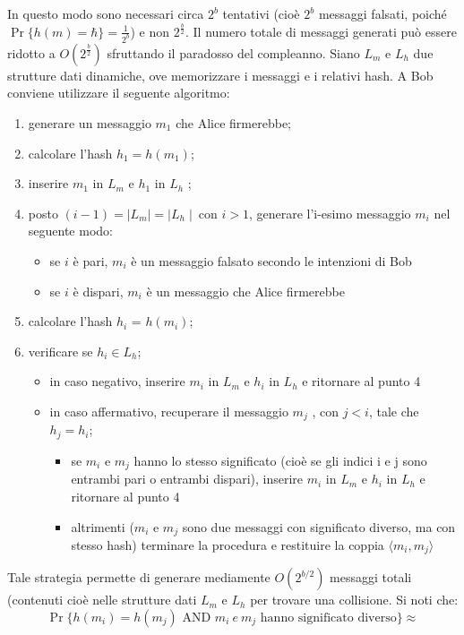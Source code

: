 In questo modo sono necessari circa $2^b$ tentativi (cioè $2^b$ messaggi falsati, poiché $\Pr \{h(m) = \hbar \} = \frac{1}{2^b}$) e non $2^{\frac{b}{2}}$. Il numero totale di messaggi generati può essere ridotto a $O(2^{\frac{b}{2}})$ sfruttando il paradosso del compleanno. Siano $L_m$ e $L_h$ due strutture dati dinamiche, ove memorizzare i messaggi e i relativi hash. A Bob conviene utilizzare il seguente algoritmo:
\begin{enumerate}
\item generare un messaggio $m_1$ che Alice firmerebbe;
\item calcolare l'hash $h_1 = h(m_1)$;
\item inserire $m_1$ in $L_m$ e $h_1$ in $L_h$ ;
\item posto $(i - 1) = \mid L_m \mid = \mid L_h \mid \: \text{con } i>1$, generare l'i-esimo messaggio $m_i$ nel seguente modo:
	\begin{itemize}
		\item se $i$ è pari, $m_i$ è un messaggio falsato secondo le intenzioni di Bob
		\item se $i$ è dispari, $m_i$ è un messaggio che Alice firmerebbe
	\end{itemize}
\item calcolare l'hash $h_i$ = $h(m_i)$;
\item verificare se $h_i \in L_h$;
	\begin{itemize}
		\item in caso negativo, inserire $m_i$ in $L_m$ e $h_i$ in $L_h$ e ritornare al punto 4
		\item in caso affermativo, recuperare il messaggio $m_j$ , con $j < i$, tale che $h_j = h_i$;
		\begin{itemize}
			\item se $m_i$ e $m_j$ hanno lo stesso significato (cioè se gli indici i e j sono entrambi pari o entrambi dispari), inserire $m_i$ in $L_m$ e $h_i$ in $L_h$ e ritornare al punto 4
			\item altrimenti ($m_i$ e $m_j$ sono due messaggi con significato diverso, ma con stesso hash) terminare la procedura e restituire la coppia $\langle m_i , m_j \rangle$
		\end{itemize}
	\end{itemize}
\end{enumerate}
Tale strategia permette di generare mediamente $O(2^{b/2})$ messaggi totali (contenuti cioè nelle strutture dati $L_m$ e $L_h$ per trovare una collisione. Si noti che:
\begin{equation} \label{eq:pr_coll_1}
\Pr \{ h(m_i) = h(m_j) \text{ AND } m_i \: e \: m_j  \mbox{ hanno significato diverso} \} \approx
\end{equation}
